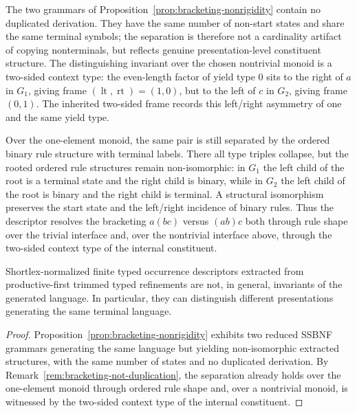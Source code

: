\documentclass[sub]{jalc}
\newcommand{\lt}{\operatorname{lt}}
\newcommand{\rt}{\operatorname{rt}}
\begin{document}
\begin{remark}
\label{rem:bracketing-not-duplication}
The two grammars of Proposition~\ref{prop:bracketing-nonrigidity} contain no duplicated derivation. They have the same number of non-start states and share the same terminal symbols; the separation is therefore not a cardinality artifact of copying nonterminals, but reflects genuine presentation-level constituent structure. The distinguishing invariant over the chosen nontrivial monoid is a two-sided context type: the even-length factor of yield type \(0\) sits to the right of \(a\) in \(G_1\), giving frame \((\lt,\rt)=(1,0)\), but to the left of \(c\) in \(G_2\), giving frame \((0,1)\). The inherited two-sided frame records this left/right asymmetry of one and the same yield type.

Over the one-element monoid, the same pair is still separated by the ordered binary rule structure with terminal labels. There all type triples collapse, but the rooted ordered rule structures remain non-isomorphic: in \(G_1\) the left child of the root is a terminal state and the right child is binary, while in \(G_2\) the left child of the root is binary and the right child is terminal. A structural isomorphism preserves the start state and the left/right incidence of binary rules. Thus the descriptor resolves the bracketing \(a(bc)\) versus \((ab)c\) both through rule shape over the trivial interface and, over the nontrivial interface above, through the two-sided context type of the internal constituent.
\end{remark}

\begin{theorem}
\label{thm:non-rigidity}
Shortlex-normalized finite typed occurrence descriptors extracted from productive-first trimmed typed refinements are not, in general, invariants of the generated language. In particular, they can distinguish different presentations generating the same terminal language.
\end{theorem}

\begin{proof}
Proposition~\ref{prop:bracketing-nonrigidity} exhibits two reduced SSBNF grammars generating the same language but yielding non-isomorphic extracted structures, with the same number of states and no duplicated derivation. By Remark~\ref{rem:bracketing-not-duplication}, the separation already holds over the one-element monoid through ordered rule shape and, over a nontrivial monoid, is witnessed by the two-sided context type of the internal constituent.
\end{proof}
\end{document}
